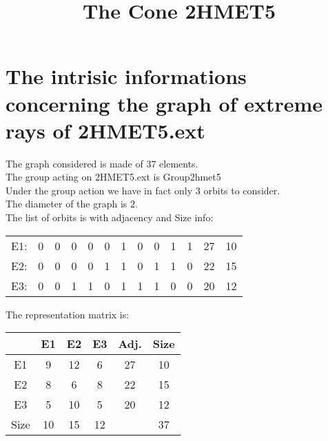 \documentclass[12pt]{article}
\title{The Cone 2HMET5}
\begin{document}
\maketitle
\section{The intrisic informations concerning the graph of extreme rays of 2HMET5.ext}
The graph considered is made of $37$ elements.\\
The group acting on 2HMET5.ext is Group2hmet5\\
Under the group action we have in fact only $3$ orbits to consider.\\
The diameter of the graph is $2$.\\
The list of orbits is with adjacency and Size info:
\begin{center}
\scriptsize
\begin{tabular}{ccccccccccc|c|c}
E1:&0&0&0&0&0&1&0&0&1&1&27&10\\
E2:&0&0&0&0&1&1&0&1&1&0&22&15\\
E3:&0&0&1&1&0&1&1&1&0&0&20&12\\
\end{tabular}
\end{center}
The representation matrix is:
\begin{center}
\scriptsize
\begin{tabular}{|c|ccc|c|c|}
\hline
&E1&E2&E3&Adj.&Size\\
\hline
E1& 9& 12& 6&27&10\\
E2& 8& 6& 8&22&15\\
E3& 5& 10& 5&20&12\\
\hline
Size&10&15&12&&37\\
\hline
\end{tabular}
\end{center}
\end{document}
